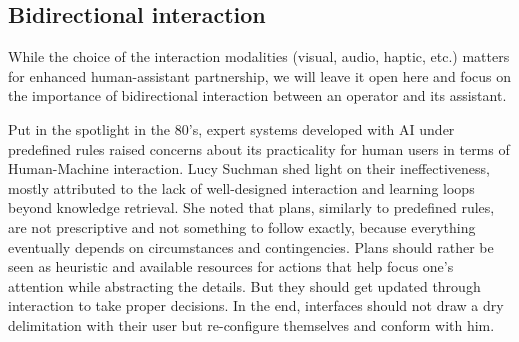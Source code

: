 \documentclass{IOS-Book-Article}
\begin{document}
\subsection{Bidirectional interaction}\label{bidirectional-interaction}
While the choice of the interaction modalities (visual, audio, haptic, etc.) matters for enhanced human-assistant partnership, we will leave it open here and focus on the importance of bidirectional interaction between an operator and its assistant.

Put in the spotlight in the 80’s, expert systems developed with AI under predefined rules raised concerns about its practicality for human users in terms of Human-Machine interaction.  Lucy Suchman \cite{suchman1987plans} shed light on their ineffectiveness, mostly attributed to the lack of well-designed interaction and learning loops beyond knowledge retrieval. She noted that plans, similarly to predefined rules, are not  prescriptive  and  not  something  to  follow  exactly, because everything eventually depends on circumstances and contingencies. Plans should rather be seen as heuristic and available resources for actions that help focus one's attention while abstracting the details. But they should get updated through interaction to take proper decisions. In the end, interfaces should not draw a dry delimitation with their user but re-configure themselves and conform with him.
\end{document}
